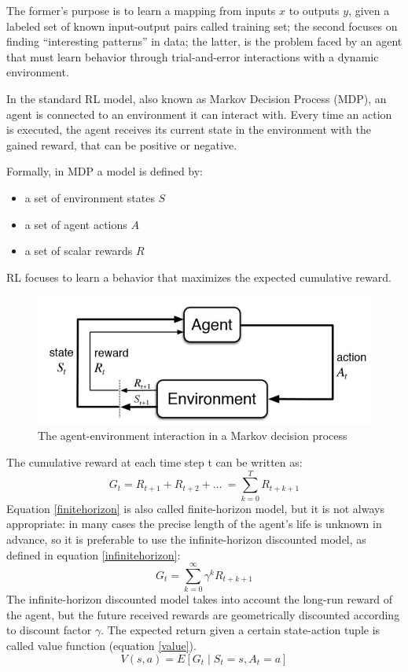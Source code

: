 \documentclass[Lau,oneside,noexaminfo]{sapthesis} %
\begin{document}
The former’s purpose is to learn a mapping from inputs $x$ to outputs $y$, given a labeled set of known input-output pairs called training set; the second focuses on finding “interesting patterns” in data; \cite{MURPHY} the latter, is the problem faced by an agent that must learn behavior through trial-and-error interactions with a dynamic environment. 

In the standard RL model, also known as Markov Decision Process (MDP), an agent is connected to an environment it can interact with. Every time an action is executed, the agent receives its current state in the environment with the gained reward, that can be positive or negative. 

Formally, in MDP a model is defined by:
\begin{itemize}
  \item a set of environment states $S$
  \item a set of agent actions $A$
  \item a set of scalar rewards $R$
\end{itemize}
RL focuses to learn a behavior that maximizes the expected cumulative reward. \cite{RLSURVEY} 

\begin{figure}[H]
\caption{The agent-environment interaction in a Markov decision process \cite{SUTTONBARTO}}
\centering
\includegraphics[width=\textwidth]{markov}
\end{figure}
The cumulative reward at each time step  t can be written as:
\begin{equation}
G_t = R_{t+1} + R_{t+2} + \dots\ = \sum_{k=0}^{T}R_{t+k+1}
\label{finitehorizon}
\end{equation}
Equation \ref{finitehorizon} is also called finite-horizon model, but it is not always appropriate: in many cases the precise length of the agent's life is unknown in advance, so it is preferable to use the infinite-horizon discounted model, as defined in equation \ref{infinitehorizon}:
\begin{equation}
G_t = \sum_{k=0}^{\infty}\gamma^k R_{t+k+1}
\label{infinitehorizon}
\end{equation}
The infinite-horizon discounted model takes into account the long-run reward of the agent, but the future received rewards are geometrically discounted according to discount factor $\gamma$.
The expected return given a certain state-action tuple is called value function (equation \ref{value}).
\begin{equation}
V(s,a) = E[G_t \mid S_t=s, A_t = a]
\label{value}
\end{equation}
\end{document}
